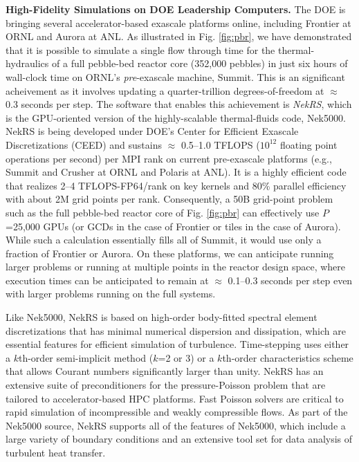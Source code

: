 \noindent
{\bf High-Fidelity Simulations on DOE Leadership Computers.}
The DOE is bringing several accelerator-based exascale platforms online,
including Frontier at ORNL and Aurora at ANL.  As illustrated in Fig.
\ref{fig:pbr}, we have demonstrated that it is possible to simulate a single
flow through time for the thermal-hydraulics of a full pebble-bed reactor core
(352,000 pebbles) in just six hours of wall-clock time on ORNL's {\em
pre}-exascale machine, Summit.   This is an significant acheivement as it
involves updating a quarter-trillion degrees-of-freedom at $\approx$ 0.3
seconds per step.  The software that enables this achievement is {\em NekRS},
which is the GPU-oriented version of the highly-scalable thermal-fluids code,
Nek5000.  NekRS is being developed under DOE's Center for Efficient Exascale
Discretizations (CEED) and sustains $\approx$ 0.5--1.0 TFLOPS ($10^{12}$
floating point operations per second) per MPI rank on current pre-exascale
platforms (e.g., Summit and Crusher at ORNL and Polaris at ANL).  It is a
highly efficient code that realizes 2--4 TFLOPS-FP64/rank on key kernels and
80\% parallel efficiency with about 2M grid points per rank.  Consequently, a
50B grid-point problem such as the full pebble-bed reactor core of Fig.
\ref{fig:pbr} can effectively use $P$=25,000 GPUs (or GCDs in the case of
Frontier or tiles in the case of Aurora).  While such a calculation essentially
fills all of Summit, it would use only a fraction of Frontier or Aurora.  On
these platforms, we can anticipate running larger problems or running at
multiple points in the reactor design space, where execution times can be
anticipated to remain at $\approx$ 0.1--0.3 seconds per step even with larger
problems running on the full systems.

Like Nek5000, NekRS is based on high-order body-fitted spectral element
discretizations that has minimal numerical dispersion and dissipation, which
are essential features for efficient simulation of turbulence.  Time-stepping
uses either a $k$th-order semi-implicit method ($k$=2 or 3) or a $k$th-order
characteristics scheme that allows Courant numbers significantly larger than
unity.  NekRS has an extensive suite of preconditioners for the
pressure-Poisson problem that are tailored to accelerator-based HPC platforms.
Fast Poisson solvers are critical to rapid simulation of incompressible and
weakly compressible flows.   As part of the Nek5000 source, NekRS supports all
of the features of Nek5000, which include a large variety of boundary conditions
and an extensive tool set for data analysis of turbulent heat transfer.



